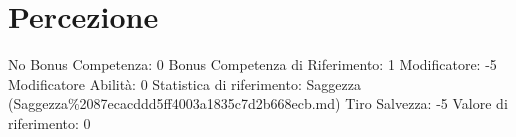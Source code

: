 \section{Percezione}\label{percezione}

\begin{description}
\tightlist
\item[Tags: ABI]
No Bonus Competenza: 0 Bonus Competenza di Riferimento: 1 Modificatore:
-5 Modificatore Abilità: 0 Statistica di riferimento: Saggezza
(Saggezza\%2087ecacddd5ff4003a1835c7d2b668ecb.md) Tiro Salvezza: -5
Valore di riferimento: 0
\end{description}
